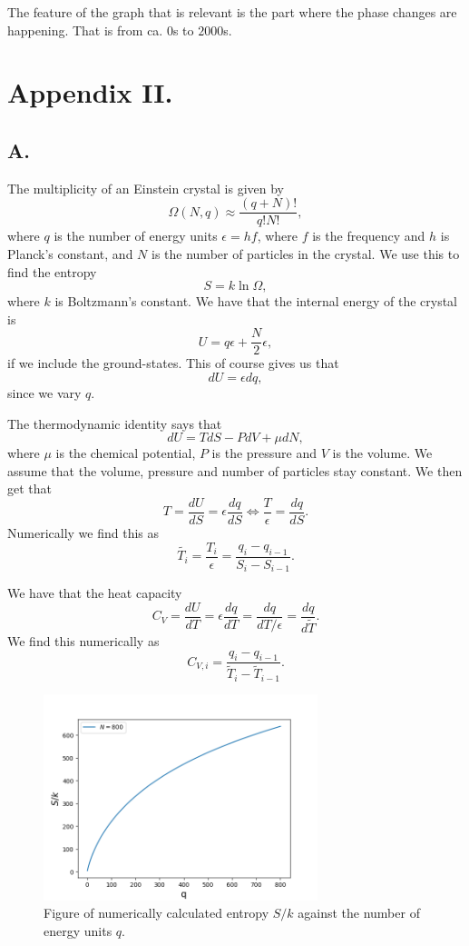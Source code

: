 \documentclass[reprint,english,notitlepage]{revtex4-1}  %
\begin{document}
The feature of the graph that is relevant is the part where the phase changes are happening. That is from ca. $0$s to $2000$s.
\appendix
\label{appendix_2}
\section*{Appendix II.}

\subsection*{A.}
The multiplicity of an Einstein crystal is given by 
$$ \Omega(N,q)\approx \frac{(q+N)!}{q!N!},$$
 where $q$ is the number of energy units $\epsilon=hf$, where $f$ is the frequency and $h$ is Planck's constant, and $N$ is the number of particles in the crystal. We use this to find the entropy
  $$S=k\ln\Omega,$$ 
  where $k$ is Boltzmann's constant. We have that the internal energy of the crystal is 
  $$U=q\epsilon+\frac{N}{2}\epsilon,$$
  if we include the ground-states. This of course gives us that 
  $$ dU=\epsilon dq,$$
  since we vary $q$. 
  
  The thermodynamic identity says that 
  $$ dU=TdS-PdV+\mu dN,$$
  where $\mu$ is the chemical potential, $P$ is the pressure and $V$ is the volume. We assume that the volume, pressure and number of particles stay constant. We then get that
  $$T= \frac{dU}{dS}=\epsilon\frac{dq}{dS}\Leftrightarrow \frac{T}{\epsilon}=\frac{dq}{dS}.$$
  Numerically we find this as
  $$\tilde{T_i} =\frac{T_i}{\epsilon}=\frac{q_i-q_{i-1}}{S_i-S_{i-1}}.$$

We have that the heat capacity 
$$C_V=\frac{dU}{dT}=\epsilon\frac{dq}{dT}=\frac{dq}{dT/\epsilon}=\frac{dq}{d\tilde{T}}.$$
We find this numerically as 
$$ C_{V,i}=\frac{q_{i}-q_{i-1}}{\tilde{T}_i-\tilde{T}_{i-1}}.$$

\begin{figure}
\centering
\includegraphics[width=8cm]{../figures/S_mot_q.png}
\caption{Figure of numerically calculated entropy $S/k$ against the number of energy units $q$.}
\label{fig:S_mot_q}
\end{figure}
  
\end{document}
